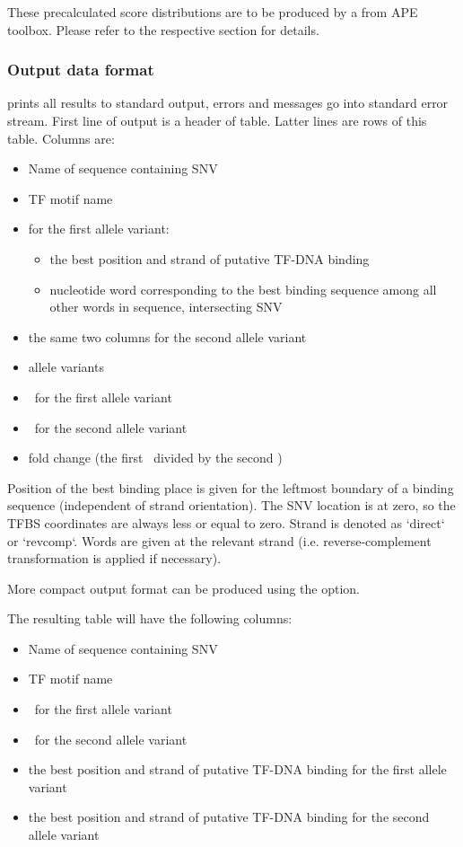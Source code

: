 These precalculated score distributions are to be produced by a  from APE toolbox.
Please refer to the respective section for details.


\example{}

\subsubsection{Output data format}

 prints all results to standard output, errors and messages go into standard error stream. First line of output is a header of table. Latter lines are rows of this table. Columns are:
\begin{itemize}
\item Name of sequence containing SNV
\item TF motif name
\item for the first allele variant:
\begin{itemize}
\item   the best position and strand of putative TF-DNA binding
\item   nucleotide word corresponding to the best binding sequence among all other words in sequence, intersecting SNV
\end{itemize}
\item the same two columns for the second allele variant
\item allele variants
\item \pvalue\ for the first allele variant
\item \pvalue\ for the second allele variant
\item fold change (the first \pvalue\ divided by the second \pvalue)
\end{itemize}

Position of the best binding place is given for the leftmost boundary of a binding sequence (independent of strand orientation). The SNV location is at zero, so the TFBS coordinates are always less or equal to zero. Strand is denoted as `direct` or `revcomp`. Words are given at the relevant strand (i.e. reverse-complement transformation is applied if necessary).

More compact output format can be produced using the  option.

The resulting table will have the following columns:
\begin{itemize}
\item Name of sequence containing SNV
\item TF motif name
\item \pvalue\ for the first allele variant
\item \pvalue\ for the second allele variant
\item the best position and strand of putative TF-DNA binding for the first allele variant
\item the best position and strand of putative TF-DNA binding for the second allele variant
\end{itemize}

